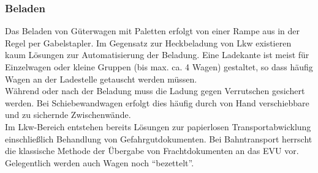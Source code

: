 \subsubsection{Beladen}
Das Beladen von Güterwagen mit Paletten erfolgt von einer Rampe aus in der Regel per Gabelstapler. Im Gegensatz zur Heckbeladung von Lkw existieren kaum Lösungen zur Automatisierung der Beladung. Eine Ladekante ist meist für Einzelwagen oder kleine Gruppen (bis max. ca. 4 Wagen) gestaltet, so dass häufig Wagen an der Ladestelle getauscht werden müssen.\\
Während oder nach der Beladung muss die Ladung gegen Verrutschen gesichert werden. Bei Schiebewandwagen erfolgt dies häufig durch von Hand verschiebbare und zu sichernde Zwischenwände.\\
Im Lkw-Bereich entstehen bereits Lösungen zur papierlosen Transportabwicklung einschließlich Behandlung von Gefahrgutdokumenten. Bei Bahntransport herrscht die klassische Methode der Übergabe von Frachtdokumenten an das EVU vor. Gelegentlich werden auch Wagen noch "`bezettelt"'.

